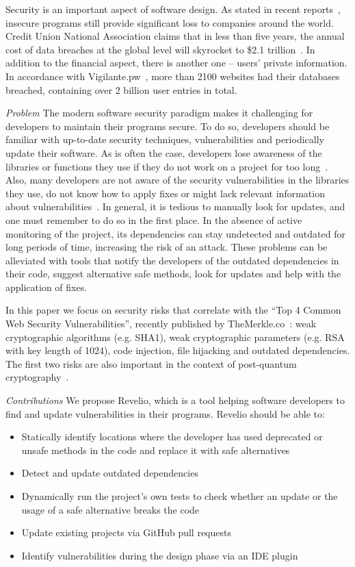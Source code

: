 Security is an important aspect of software design. As stated in recent reports~\cite{kaspersky}, insecure programs still provide significant loss to companies around the world. Credit Union National Association claims that in less than five years, the annual cost of data breaches at the global level will skyrocket to \$2.1 trillion~\cite{juniper}. In addition to the financial aspect, there is another one -- users' private information. In accordance with Vigilante.pw~\cite{vigilantpw}, more than 2100 websites had their databases breached, containing over 2 billion user entries in total.

\emph{Problem} The modern software security paradigm makes it challenging for developers to maintain their programs secure. To do so, developers should be familiar with up-to-date security techniques, vulnerabilities and periodically update their software.
As is often the case, developers lose awareness of the libraries or functions they use if they do not work on a project for too long~\cite{kula2018developers}. Also, many developers are not aware of the security vulnerabilities in the libraries they use, do not know how to apply fixes or might lack relevant information about vulnerabilities~\cite{cloudpassage}. In general, it is tedious to manually look for updates, and one must remember to do so in the first place. In the absence of active monitoring of the project, its dependencies can stay undetected and outdated for long periods of time, increasing the risk of an attack.
These problems can be alleviated with tools that notify the developers of the outdated dependencies in their code, suggest alternative safe methods, look for updates and help with the application of fixes.

In this paper we focus on security risks that correlate with the \enquote{Top 4 Common Web Security Vulnerabilities}, recently published by TheMerkle.co~\cite{merkle}: weak cryptographic algorithms (e.g. SHA1), weak cryptographic parameters (e.g. RSA with key length of 1024), code injection, file hijacking and outdated dependencies.
The first two risks are also important in the context of post-quantum cryptography~\cite{buchmann2008post}.

\emph{Contributions} We propose Revelio, which is a tool helping software developers to find and update vulnerabilities in their programs.
Revelio should be able to:
\begin{itemize}
    \item Statically identify locations where the developer has used deprecated or unsafe methods in the code and replace it with safe alternatives
    \item Detect and update outdated dependencies
    \item Dynamically run the project's own tests to check whether an update or the usage of a safe alternative breaks the code
    \item Update existing projects via GitHub pull requests
    \item Identify vulnerabilities during the design phase via an IDE plugin
\end{itemize}

